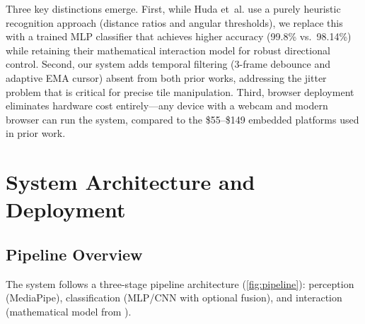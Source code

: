 \documentclass[11pt,a4paper]{article}
\begin{document}
Three key distinctions emerge. First, while Huda et~al. use a purely heuristic recognition approach (distance ratios and angular thresholds), we replace this with a trained MLP classifier that achieves higher accuracy (99.8\% vs.\ 98.14\%) while retaining their mathematical interaction model for robust directional control. Second, our system adds temporal filtering (3-frame debounce and adaptive EMA cursor) absent from both prior works, addressing the jitter problem that is critical for precise tile manipulation. Third, browser deployment eliminates hardware cost entirely---any device with a webcam and modern browser can run the system, compared to the \$55--\$149 embedded platforms used in prior work.


\section{System Architecture and Deployment}
\label{sec:architecture}

\subsection{Pipeline Overview}

The system follows a three-stage pipeline architecture (\cref{fig:pipeline}): perception (MediaPipe), classification (MLP/CNN with optional fusion), and interaction (mathematical model from ).
\end{document}
